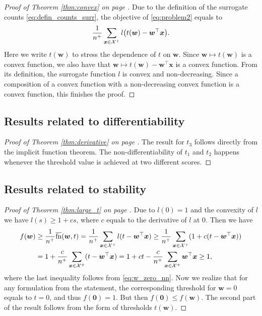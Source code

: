 \thmconvex*
\begin{proof}[Proof of Theorem \ref{thm:convex} on page \pageref{thm:convex}]
  Due to the definition of the surrogate counts \eqref{eq:defin_counts_surr}, the objective of \eqref{eq:problem2} equals to
  \begin{equation*}
    \frac{1}{n^+}\sum_{\bm{x} \in \Xc^+} l\Brac{t(\bm{w})-\bm{w}^\top \bm{x}}.
  \end{equation*}
  Here we write $t(\bm{w})$ to stress the dependence of $t$ on $\bm{w}$. Since $\bm{w}\mapsto t(\bm{w})$ is a convex function, we also have that $\bm{w}\mapsto t(\bm{w})-\bm{w}^\top \bm{x}$ is a convex function. From its definition, the surrogate function $l$ is convex and non-decreasing. Since a composition of a convex function with a non-decreasing convex function is a convex function, this finishes the proof.
\end{proof}

\subsection{Results related to differentiability}

\derivative*
\begin{proof}[Proof of Theorem \ref{thm:derivative} on page \pageref{thm:derivative}]
  The result for $t_3$ follows directly from the implicit function theorem. The non-differentiability of $t_1$ and $t_2$ happens whenever the threshold value is achieved at two different scores.
\end{proof}

\subsection{Results related to stability}

\larget*
\begin{proof}[Proof of Theorem \ref{thm:large_t} on page \pageref{thm:large_t}]
  Due to $l(0)=1$ and the convexity of $l$ we have $l(s)\ge 1+cs$, where $c$ equals to the derivative of $l$ at $0$. Then we have
  \begin{equation*}
    \begin{aligned}
      f(\bm{w}) 
      & \ge \frac{1}{n^+}\overline{\textnormal{fn}}(\bm{w}, t) = \frac{1}{n^+}\sum_{\bm{x} \in \mathcal{X}^+}l(t-\bm{w}^\top \bm{x}) \ge \frac{1}{n^+}\sum_{\bm{x} \in \mathcal{X}^+}(1+c(t-\bm{w}^\top \bm{x})) \\
      & = 1+\frac{c}{n^+}\sum_{\bm{x} \in \mathcal{X}^+}(t-\bm{w}^\top \bm{x}) = 1+ct - \frac{c}{n^+}\sum_{\bm{x} \in \mathcal{X}^+}\bm{w}^\top \bm{x} \ge 1,
    \end{aligned}
  \end{equation*}
  where the last inequality follows from \eqref{eq:w_zero_nn}. Now we realize that for any formulation from the statement, the corresponding threshold for $\bm{w}=0$ equals to $t=0$, and thus $f(\bm{0})=1$. But then $f(\bm{0})\le f(\bm{w})$. The second part of the result follows from the form of thresholds $t(\bm{w})$.
\end{proof}

